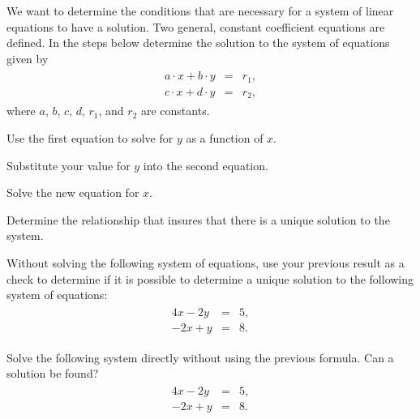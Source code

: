 \begin{problem}
\item We want to determine the conditions that are necessary for a system of linear
  equations to have a solution. Two general, constant coefficient equations are defined.
  In the steps below determine the solution to the system of equations given by
\begin{eqnarray*}
  \begin{array}{lcl}
    a \cdot x + b \cdot y & = & r_1, \\
    c \cdot x + d \cdot y & = & r_2,
  \end{array}
\end{eqnarray*}
where $a$, $b$, $c$, $d$, $r_1$, and $r_2$ are constants.
\begin{subproblem}
  \item Use the first equation to solve for $y$ as a function of $x$.
    \vfill
  \item Substitute your value for $y$ into the second equation.
    \vfill
  \item Solve the new equation for $x$.
    \vfill
  \item Determine the relationship that insures that there is a unique solution to the system.
    \vfill
\end{subproblem}

  \clearpage

\item Without solving the following system of equations, use your previous result as a check to determine if it is possible to determine a unique solution to the following system of equations:
\begin{eqnarray*}
  \begin{array}{lcl}
     4x - 2y & = & 5, \\
    -2x + y & = & 8.
  \end{array}
\end{eqnarray*}

  \vspace{4em}

\item Solve the following system directly without using the previous formula. Can a solution be found? \label{question:linearNonsolvable}
\begin{eqnarray*}
  \begin{array}{lcl}
     4x - 2y & = & 5, \\
    -2x + y & = & 8.
  \end{array}
\end{eqnarray*}


\end{problem}

